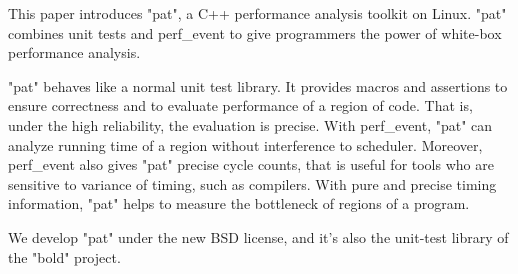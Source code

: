 This paper introduces "pat", a C++ performance analysis toolkit on Linux.
"pat" combines unit tests and perf_event to give programmers the power of white-box performance analysis.

"pat" behaves like a normal unit test library.
It provides macros and assertions to ensure correctness and to evaluate performance of a region of code.
That is, under the high reliability, the evaluation is precise.
With perf_event, "pat" can analyze running time of a region without interference to scheduler. 
Moreover, perf_event also gives "pat" precise cycle counts, that is useful for tools who are sensitive to variance of timing, such as compilers.
With pure and precise timing information, "pat" helps to measure the bottleneck of regions of a program.

We develop "pat" under the new BSD license, and it's also the unit-test library of the "bold" project.
